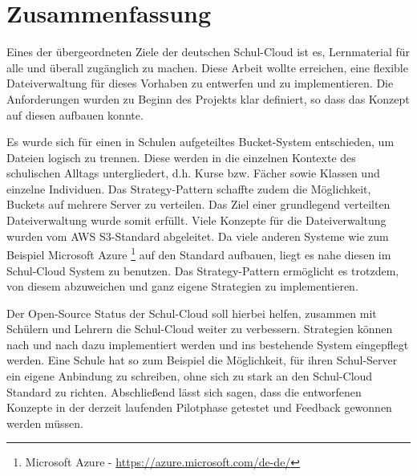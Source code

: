 \section{Zusammenfassung}
\label{sec:conclusion}

Eines der übergeordneten Ziele der deutschen Schul-Cloud ist es, Lernmaterial für alle und überall zugänglich zu machen. Diese Arbeit wollte erreichen, eine flexible Dateiverwaltung für dieses Vorhaben zu entwerfen und zu implementieren. Die Anforderungen wurden zu Beginn des Projekts klar definiert, so dass das Konzept auf diesen aufbauen konnte.

 Es wurde sich für einen in Schulen aufgeteiltes Bucket-System entschieden, um Dateien logisch zu trennen. Diese werden in die einzelnen Kontexte des schulischen Alltags untergliedert, d.h. Kurse bzw. Fächer sowie Klassen und einzelne Individuen. Das Strategy-Pattern schaffte zudem die Möglichkeit, Buckets auf mehrere Server zu verteilen. Das Ziel einer grundlegend verteilten Dateiverwaltung wurde somit erfüllt. Viele Konzepte für die Dateiverwaltung wurden vom AWS S3-Standard abgeleitet. Da viele anderen Systeme wie zum Beispiel Microsoft Azure \footnote{Microsoft Azure - \url{https://azure.microsoft.com/de-de/}} auf den Standard aufbauen, liegt es nahe diesen im Schul-Cloud System zu benutzen. Das Strategy-Pattern ermöglicht es trotzdem, von diesem abzuweichen und ganz eigene Strategien zu implementieren.

Der Open-Source Status der Schul-Cloud soll hierbei helfen, zusammen mit Schülern und Lehrern die Schul-Cloud weiter zu verbessern. Strategien können nach und nach dazu implementiert werden und ins bestehende System eingepflegt werden. Eine Schule hat so zum Beispiel die Möglichkeit, für ihren Schul-Server ein eigene Anbindung zu schreiben, ohne sich zu stark an den Schul-Cloud Standard zu richten. Abschließend lässt sich sagen, dass die entworfenen Konzepte in der derzeit laufenden Pilotphase getestet und Feedback gewonnen werden müssen.

\clearpage
